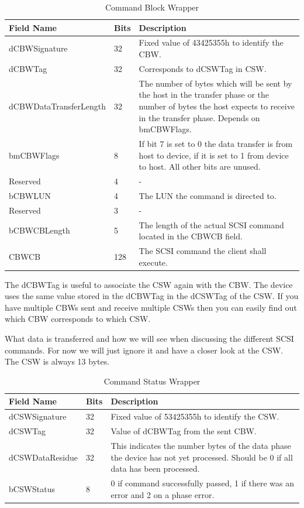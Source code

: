 \begin{table}[ht]
\caption{Command Block Wrapper \cite{usb_ms_jan}}
\centering
\begin{tabular}{|l|l|p{9cm}|}
\hline\hline
\textbf{Field Name} & \textbf{Bits} & \textbf{Description}\\ \hline
dCBWSignature & 32 & Fixed value of 43425355h to identify the CBW. \\ \hline
dCBWTag & 32 & Corresponds to dCSWTag in CSW. \\ \hline
dCBWDataTransferLength & 32 & The number of bytes which will be sent by the host in the transfer phase or the number of bytes the host expects to receive in the transfer phase. Depends on bmCBWFlags. \\ \hline
bmCBWFlags & 8 & If bit 7 is set to 0 the data transfer is from host to device, if it is set to 1 from device to host. All other bits are unused. \\ \hline
Reserved & 4 & - \\ \hline
bCBWLUN & 4 & The LUN the command is directed to. \\ \hline
Reserved & 3 & - \\ \hline
bCBWCBLength & 5 & The length of the actual SCSI command located in the CBWCB field. \\ \hline
CBWCB & 128 & The SCSI command the client shall execute. \\ \hline
\end{tabular}
\label{table:cbw}
\end{table}

The dCBWTag is useful to associate the CSW again with the CBW. The device uses the same value stored in the dCBWTag in the dCSWTag of the CSW. If you have multiple CBWs sent and receive multiple CSWs then you can easily find out which CBW corresponds to which CSW.

What data is transferred and how we will see when discussing the different SCSI commands. For now we will just ignore it and have a closer look at the CSW. The CSW is always 13 bytes.

\begin{table}[ht]
\caption{Command Status Wrapper \cite{usb_ms_jan}}
\centering
\begin{tabular}{|l|l|p{9cm}|}
\hline\hline
\textbf{Field Name} & \textbf{Bits} & \textbf{Description}\\ \hline
dCSWSignature & 32 & Fixed value of 53425355h to identify the CSW. \\ \hline
dCSWTag & 32 & Value of dCBWTag from the sent CBW. \\ \hline
dCSWDataResidue & 32 & This indicates the number bytes of the data phase the device has not yet processed. Should be 0 if all data has been processed. \\ \hline
bCSWStatus & 8 & 0 if command successfully passed, 1 if there was an error and 2 on a phase error. \\ \hline
\end{tabular}
\label{table:csw}
\end{table}

